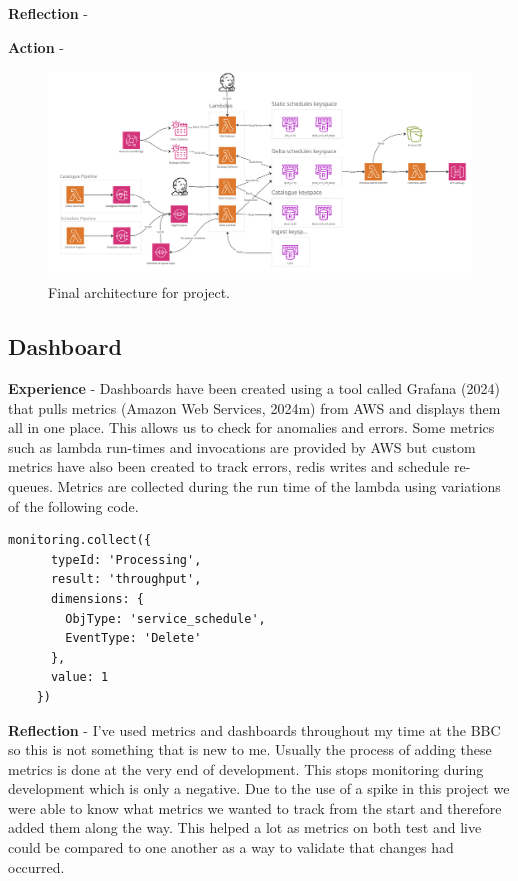   \textbf{Reflection} -

  \textbf{Action} -

  \begin{landscape}
    \begin{figure}[H]
      \centering
      \includegraphics[width=20cm]{assets/outputs/finalArchitecture.png}
      \caption{Final architecture for project.}
      \label{fig:finalArchitecture}
    \end{figure}
  \end{landscape}

  \newpage
  \subsection{Dashboard}

  \textbf{Experience} - Dashboards have been created using a tool called Grafana (2024) that pulls metrics (Amazon Web Services, 2024m) from AWS and
  displays them all in one place. This allows us to check for anomalies and errors. Some metrics such as lambda run-times and invocations are provided by 
  AWS but custom metrics have also been created to track errors, redis writes and schedule re-queues. Metrics are collected during the run time of the 
  lambda using variations of the following code.

   \begin{lstlisting}[caption=Code used to update a metric\, this variation tracks a schedule delete.]
    monitoring.collect({
      typeId: 'Processing',
      result: 'throughput',
      dimensions: {
        ObjType: 'service_schedule',
        EventType: 'Delete'
      },
      value: 1
    })
  \end{lstlisting}

  \textbf{Reflection} - I've used metrics and dashboards throughout my time at the BBC so this is not something that is new to me. Usually the process of 
  adding these metrics is done at the very end of development. This stops monitoring during development which is only a negative. Due to the use of a spike 
  in this project we were able to know what metrics we wanted to track from the start and therefore added them along the way. This helped a lot as metrics on 
  both test and live could be compared to one another as a way to validate that changes had occurred.
  
